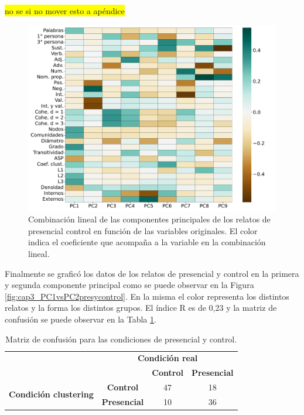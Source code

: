 \colorbox{yellow}{no se si no mover esto a apéndice}

\begin{figure}[h]
    \centering
    \includegraphics[width = 15cm]{figures/ch03/PCA_clustering/Primer tiempo/9PCs_pres_control.pdf} 
    \caption{Combinación lineal de las componentes principales de los relatos de presencial control en función de las variables originales. El color indica el coeficiente que acompaña a la variable en la combinación lineal.}
\label{fig:cap3_9PCscontrolpres}
\end{figure}

Finalmente se graficó los datos de los relatos de presencial y control en la primera y segunda componente principal como se puede observar en la Figura \ref{fig:cap3_PC1vsPC2presycontrol}. En la misma el color representa los distintos relatos y la forma los distintos grupos. El índice R es de 0,23 y la matriz de confusión se puede observar en la Tabla \ref{tab:confusion_matrix_PyC}.

\begin{table}[htbp]
    \centering
    \begin{tabular}{|l|c|c|c|}
        \hline
        \multicolumn{1}{|c|}{} & \multicolumn{3}{c|}{\textbf{Condición real}} \\
        \cline{2-4}
        \multicolumn{1}{|c|}{} & & \textbf{Control} & \textbf{Presencial} \\
        \hline
        \multirow{2}{*}{\textbf{Condición clustering}} & \textbf{Control} & 47 & 18 \\
        \cline{2-4}
        & \textbf{Presencial} & 10 & 36 \\
        \hline
    \end{tabular}
    \caption{Matriz de confusión para las condiciones de presencial y control.}
    \label{tab:confusion_matrix_PyC}
\end{table}



